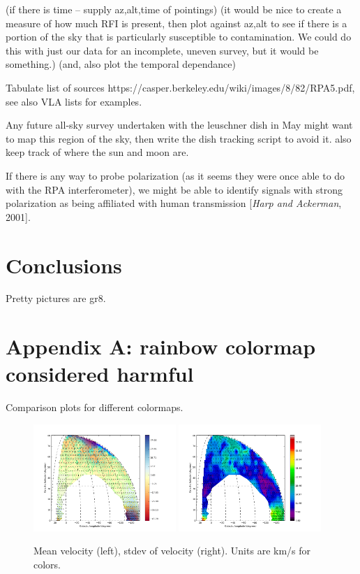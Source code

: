 \documentclass[10pt]{article}
\begin{document}
(if there is time -- supply az,alt,time of pointings)
(it would be nice to create a measure of how much RFI is present, then plot against az,alt to see if there is a portion of the sky that is particularly susceptible to contamination.  We could do this with just our data for an incomplete, uneven survey, but it would be something.)
(and, also plot the temporal dependance)

Tabulate list of sources
https://casper.berkeley.edu/wiki/images/8/82/RPA5.pdf, see also VLA lists for examples.

Any future all-sky survey undertaken with the leuschner dish in May might want to map this region of the sky, then write the dish tracking script to avoid it.  also keep track of where the sun and moon are.

If there is any way to probe polarization (as it seems they were once able to do with the RPA interferometer), we might be able to identify signals with strong polarization as being affiliated with human transmission [\textit{Harp and Ackerman}, 2001].

\section{Conclusions}

Pretty pictures are gr8.

\section{Appendix A: rainbow colormap considered harmful}

Comparison plots for different colormaps.

\begin{figure}[!ht]
    \centering
    \includegraphics[width=0.48\textwidth]{v_ave_temporary.png}
    \includegraphics[width=0.48\textwidth]{v_std_temporary.png} \\
    \caption{Mean velocity (left), stdev of velocity (right).  Units are km/s for colors.}
    \label{fig:velocs_again}
\end{figure}
\end{document}
